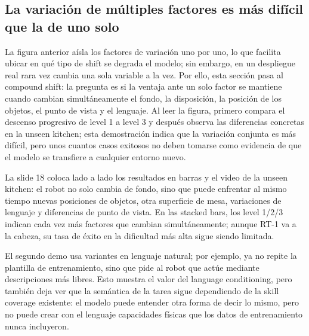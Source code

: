 \subsection{La variación de múltiples factores es más difícil que la de uno solo}

La figura anterior aísla los factores de variación uno por uno, lo que facilita ubicar en qué tipo de shift se degrada el modelo; sin embargo, en un despliegue real rara vez cambia una sola variable a la vez. Por ello, esta sección pasa al compound shift: la pregunta es si la ventaja ante un solo factor se mantiene cuando cambian simultáneamente el fondo, la disposición, la posición de los objetos, el punto de vista y el lenguaje. Al leer la figura, primero compara el descenso progresivo de level 1 a level 3 y después observa las diferencias concretas en la unseen kitchen; esta demostración indica que la variación conjunta es más difícil, pero unos cuantos casos exitosos no deben tomarse como evidencia de que el modelo se transfiere a cualquier entorno nuevo.

La slide 18 coloca lado a lado los resultados en barras y el video de la unseen kitchen: el robot no solo cambia de fondo, sino que puede enfrentar al mismo tiempo nuevas posiciones de objetos, otra superficie de mesa, variaciones de lenguaje y diferencias de punto de vista. En las stacked bars, los level 1/2/3 indican cada vez más factores que cambian simultáneamente; aunque RT-1 va a la cabeza, su tasa de éxito en la dificultad más alta sigue siendo limitada.


El segundo demo usa variantes en lenguaje natural; por ejemplo, ya no repite la plantilla de entrenamiento, sino que pide al robot que actúe mediante descripciones más libres. Esto muestra el valor del language conditioning, pero también deja ver que la semántica de la tarea sigue dependiendo de la skill coverage existente: el modelo puede entender otra forma de decir lo mismo, pero no puede crear con el lenguaje capacidades físicas que los datos de entrenamiento nunca incluyeron.


